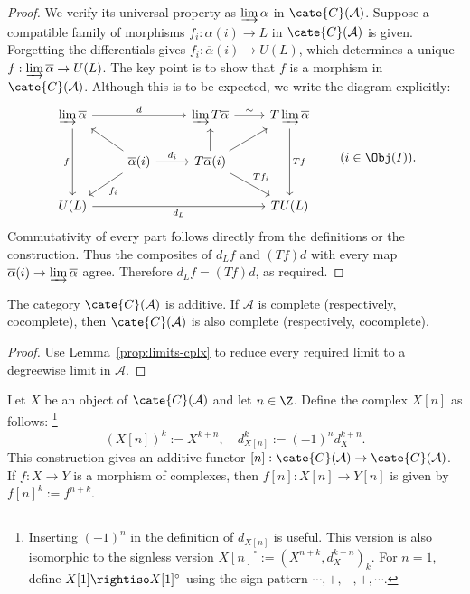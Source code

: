 \begin{proof}
	We verify its universal property as $\varinjlim\alpha$ in
	$\cate{C}(\mathcal{A})$. Suppose a compatible family of morphisms
	$f_i:\alpha(i)\to L$ in $\cate{C}(\mathcal{A})$ is given. Forgetting the
	differentials gives $f_i:\overline{\alpha}(i)\to U(L)$, which determines a
	unique $f:\varinjlim\overline{\alpha}\to U(L)$. The key point is to show
	that $f$ is a morphism in $\cate{C}(\mathcal{A})$. Although this is to be
	expected, we write the diagram explicitly:
	\[\begin{tikzcd}
		\varinjlim \overline{\alpha} \arrow[dd, "f"'] \arrow[rr, "d"] & & \varinjlim T\overline{\alpha} \arrow[r, "\sim"] & T\varinjlim \overline{\alpha} \arrow[dd, "{Tf}"] \\
		& \overline{\alpha}(i) \arrow[lu] \arrow[ld, "{f_i}"] \arrow[r, "d_i"] & T\overline{\alpha}(i) \arrow[ru] \arrow[rd, "{Tf_i}"] \arrow[u] & \\
		U(L) \arrow[rrr, "d_L"'] & & & TU(L)
	\end{tikzcd} \qquad (i \in \Obj(I)). \]
	Commutativity of every part follows directly from the definitions or the
	construction. Thus the composites of $d_Lf$ and $(Tf)d$ with every map
	$\overline{\alpha}(i)\to\varinjlim\overline{\alpha}$ agree. Therefore
	$d_Lf=(Tf)d$, as required.
\end{proof}

\begin{proposition}\label{prop:additive-cat-cplx}
	The category $\cate{C}(\mathcal{A})$ is additive. If $\mathcal{A}$ is
	complete (respectively, cocomplete), then $\cate{C}(\mathcal{A})$ is also
	complete (respectively, cocomplete).
\end{proposition}
\begin{proof}
	Use Lemma~\ref{prop:limits-cplx} to reduce every required limit to a
	degreewise limit in $\mathcal{A}$.
\end{proof}

\begin{definition}\label{def:translation-functor}
	Let $X$ be an object of $\cate{C}(\mathcal{A})$ and let $n\in\Z$. Define
	the complex $X[n]$ as follows:%
	\footnote{Inserting $(-1)^n$ in the definition of $d_{X[n]}$ is useful.
	This version is also isomorphic to the signless version
	$X[n]^\circ:=\left(X^{n+k},d_X^{k+n}\right)_k$. For $n=1$, define
	$X[1]\rightiso X[1]^\circ$ using the sign pattern
	$\cdots,+,-,+,\cdots$.}
	\[ \left(X[n]\right)^k:=X^{k+n},\quad
	d_{X[n]}^k:=(-1)^nd_X^{k+n}. \]
	This construction gives an additive functor
	$[n]:\cate{C}(\mathcal{A})\to\cate{C}(\mathcal{A})$. If $f:X\to Y$ is a
	morphism of complexes, then $f[n]:X[n]\to Y[n]$ is given by
	$f[n]^k:=f^{n+k}$.
\end{definition}

